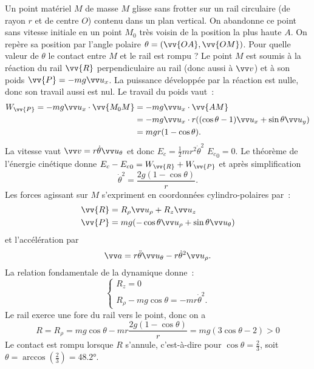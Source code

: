 Un point matériel \(M\) de masse \(M\) glisse sans frotter sur un rail circulaire (de rayon \(r\) et de centre \(O\)) contenu dans un plan vertical. On abandonne ce point sans vitesse initiale en un point \(M_0\) très voisin de la position la plus haute \(A\). On repère sa position par l'angle polaire \(\theta = (\vv{OA}, \vv{OM})\).  Pour quelle valeur de \(\theta\) le contact entre \(M\) et le rail est rompu ? Le point \(M\) est soumis à la réaction du rail \(\vv{R}\) perpendiculaire au rail (donc aussi à \(\vvv\)) et à son poids \(\vv{P} = -mg\ux\).  La puissance développée par la réaction est nulle, donc son travail aussi est nul. Le travail du poids vaut~:
\begin{align}
  W_{\vv{P}} = -mg\ux \cdot \vv{M_0M} &= -mg\ux \cdot \vv{AM} \\
  &= -mg\ux \cdot r((\cos\theta -1)\ux + \sin\theta \uy) \\
  &=mgr(1-\cos\theta).
\end{align}
La vitesse vaut \(\vvv = r\dot{\theta} \utheta\) et donc \(E_c = \frac{1}{2}mr^2\dot{\theta}^2\) \({E_c}_{0}=0\). Le théorème de l'énergie cinétique donne \(E_c - {E_c}_{0} = W_{\vv{R}} + W_{\vv{P}}\) et après simplification
\begin{equation}
  \dot{\theta}^2 = \frac{2g(1-\cos\theta)}{r}.
\end{equation}
Les forces agissant sur \(M\) s'expriment en coordonnées cylindro-polaires par~:
\begin{align}
  \vv{R} &= R_\rho \urho + R_z \uz \\
  \vv{P} &= mg(-\cos\theta \urho +\sin\theta \utheta)
\end{align}
et l'accélération par
\begin{equation}
  \va = r \ddot{\theta}\utheta -r\dot{\theta}^2\urho.
\end{equation}
La relation fondamentale de la dynamique donne~:
\begin{equation}
  \begin{cases}
    R_z = 0 \\
    R_\rho -mg\cos\theta =-mr\dot{\theta}^2.
  \end{cases}
\end{equation}
Le rail exerce une fore du rail vers le point, donc on a
\begin{equation}
  R=R_\rho = mg\cos\theta - mr \frac{2g(1-\cos\theta)}{r} = mg(3\cos\theta -2)>0
\end{equation}
Le contact est rompu lorsque \(R\) s'annule, c'est-à-dire pour \(\cos\theta = \frac{2}{3}\), soit \(\theta = \arccos\left(\frac{2}{3}\right) = \ang{48.2}\).

